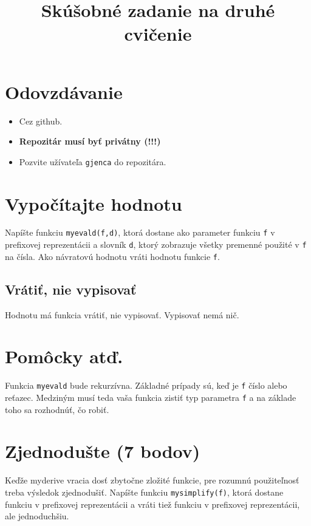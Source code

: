 \documentclass{amsart}
\begin{document}
\title{Skúšobné zadanie na druhé cvičenie}
\maketitle
\section{Odovzdávanie}
\begin{itemize}
\item Cez github. 
\item {\color{red}\bf\large Repozitár musí byť privátny (!!!)}
\item Pozvite užívateľa {\tt gjenca} do repozitára.
\end{itemize}

\section{Vypočítajte hodnotu}

Napíšte funkciu {\tt myevald(f,d)}, ktorá dostane ako parameter
funkciu {\tt f} v prefixovej reprezentácii a slovník {\tt d},
ktorý zobrazuje všetky premenné použité v {\tt f} na čísla. Ako návratovú
hodnotu vráti hodnotu funkcie {\tt f}.
\begin{framed}

\end{framed}
\subsection{Vrátiť, nie vypisovať}

Hodnotu má funkcia vrátiť, nie vypisovať. Vypisovať nemá nič.
\section{Pomôcky atď.}

Funkcia {\tt myevald} bude rekurzívna. Základné prípady sú, keď je {\tt f} číslo alebo
reťazec. Medziným musí teda vaša funkcia zistiť typ parametra {\tt f} a na základe toho sa
rozhodnúť, čo robiť.

\section{Zjednodušte (7 bodov)}
Keďže myderive vracia dosť zbytočne zložité funkcie, pre rozumnú použiteľnosť treba
výsledok zjednodušiť. Napíšte funkciu {\tt mysimplify(f)}, ktorá dostane funkciu v prefixovej
reprezentácii a vráti tiež funkciu v prefixovej reprezentácii, ale jednoduchšiu.
\end{document}
